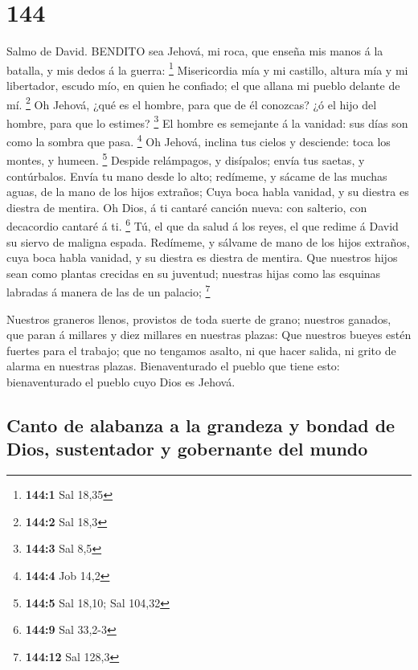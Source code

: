 \hypertarget{section-143}{%
\section{144}\label{section-143}}

 Salmo de David. BENDITO sea Jehová, mi roca, que enseña mis
manos á la batalla, y mis dedos á la guerra: \footnote{\textbf{144:1}
  Sal 18,35}  Misericordia mía y mi castillo, altura mía y
mi libertador, escudo mío, en quien he confiado; el que allana mi pueblo
delante de mí. \footnote{\textbf{144:2} Sal 18,3}  Oh
Jehová, ¿qué es el hombre, para que de él conozcas? ¿ó el hijo del
hombre, para que lo estimes? \footnote{\textbf{144:3} Sal 8,5}
 El hombre es semejante á la vanidad: sus días son como la
sombra que pasa. \footnote{\textbf{144:4} Job 14,2}  Oh
Jehová, inclina tus cielos y desciende: toca los montes, y humeen.
\footnote{\textbf{144:5} Sal 18,10; Sal 104,32}  Despide
relámpagos, y disípalos; envía tus saetas, y contúrbalos. 
Envía tu mano desde lo alto; redímeme, y sácame de las muchas aguas, de
la mano de los hijos extraños;  Cuya boca habla vanidad, y
su diestra es diestra de mentira.  Oh Dios, á ti cantaré
canción nueva: con salterio, con decacordio cantaré á ti. \footnote{\textbf{144:9}
  Sal 33,2-3}  Tú, el que da salud á los reyes, el que
redime á David su siervo de maligna espada.  Redímeme, y
sálvame de mano de los hijos extraños, cuya boca habla vanidad, y su
diestra es diestra de mentira.  Que nuestros hijos sean
como plantas crecidas en su juventud; nuestras hijas como las esquinas
labradas á manera de las de un palacio; \footnote{\textbf{144:12} Sal
  128,3}

 Nuestros graneros llenos, provistos de toda suerte de
grano; nuestros ganados, que paran á millares y diez millares en
nuestras plazas:  Que nuestros bueyes estén fuertes para el
trabajo; que no tengamos asalto, ni que hacer salida, ni grito de alarma
en nuestras plazas.  Bienaventurado el pueblo que tiene
esto: bienaventurado el pueblo cuyo Dios es Jehová.

\hypertarget{canto-de-alabanza-a-la-grandeza-y-bondad-de-dios-sustentador-y-gobernante-del-mundo}{%
\subsection{Canto de alabanza a la grandeza y bondad de Dios,
sustentador y gobernante del
mundo}\label{canto-de-alabanza-a-la-grandeza-y-bondad-de-dios-sustentador-y-gobernante-del-mundo}}

